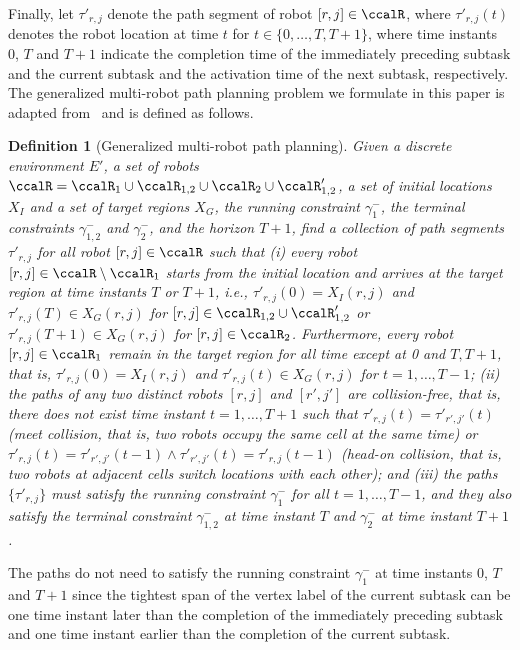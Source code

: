\documentclass[journal]{IEEEtran}
\newtheorem{defn}[thm]{Definition}
\begin{document}
{   Finally, let $\tau'_{r,j}$ denote the path segment of robot $[r,j] \in \ccalR$, where $\tau'_{r,j}(t)$ denotes the robot location at time $t$ for $ t\in \{0,  \ldots, T, T+1\}$, where time instants 0, $T$ and $T+1$ indicate the completion time of the immediately preceding subtask and the current subtask and the activation time of the next subtask, respectively.  The generalized multi-robot path planning problem we formulate in this paper is adapted from~\cite{yu2016optimal} and is defined as follows.
  \begin{defn}[Generalized multi-robot path planning]\label{defn:gmmpp}
    Given a discrete environment $E'$, a set of robots $\ccalR = \ccalR_1 \cup\ccalR_{1,2} \cup \ccalR_{2} \cup \ccalR'_{1,2}$, a set of initial locations $X_I$ and a set of target regions $X_G$, the running constraint $\gamma_1^-$, the terminal constraints $\gamma_{1,2}^-$ and $\gamma_2^-$, and the horizon $T+1$, find a collection of path segments $\tau'_{r,j}$ for all robot $[r,j]\in \ccalR$ such that {\it (i)} every robot $[r,j] \in \ccalR\setminus\ccalR_1$ starts from the initial location and arrives at the target region at time instants $T$ or $T+1$, i.e., $ \tau'_{r,j}(0) = X_I(r,j)$ and  $ \tau'_{r,j}(T) \in X_G(r,j)$ for $[r,j] \in  \ccalR_{1,2} \cup \ccalR'_{1,2}$ or $ \tau'_{r,j}(T+1) \in X_G(r,j)$ for $[r,j] \in \ccalR_{2}$. Furthermore, every robot $[r,j] \in \ccalR_1$ remain in the target region for all time except  at 0 and $T, T+1$, that is, $ \tau'_{r,j}(0) = X_I(r,j)$ and $\tau'_{r,j}(t) \in X_G(r,j)$ for $t = 1,\ldots, T-1$;
  {\it (ii)} the paths of  any two distinct robots $[r,j]$ and $[r', j']$ are collision-free, that is, there does not exist time instant $t=1, \ldots,T+1$ such that $\tau'_{r,j}(t) = \tau'_{r',j'}(t)$ (meet collision, that is, two robots occupy the same cell at the same time) or $\tau'_{r,j}(t) = \tau'_{r',j'}(t-1) \wedge \tau'_{r',j'}(t) = \tau'_{r,j}(t-1)$ (head-on collision, that is, two robots at adjacent cells switch locations with each other); and {\it (iii)} the paths $\{\tau'_{r,j}\}$ must satisfy the running constraint $\gamma^-_1$ for all $t = 1, \ldots, T-1$, and they also satisfy the terminal constraint $\gamma^-_{1,2}$ at time instant $T$ and $\gamma^-_{2}$ at time instant $T+1$.
\end{defn}

  The paths do not need to satisfy the running constraint $\gamma_1^-$ at time instants 0,  $T$ and $ T+1$ since the tightest span of the vertex label of the current subtask can be one time instant later than the completion of the immediately preceding subtask and one time instant earlier than the completion of the current subtask.



}
\end{document}
